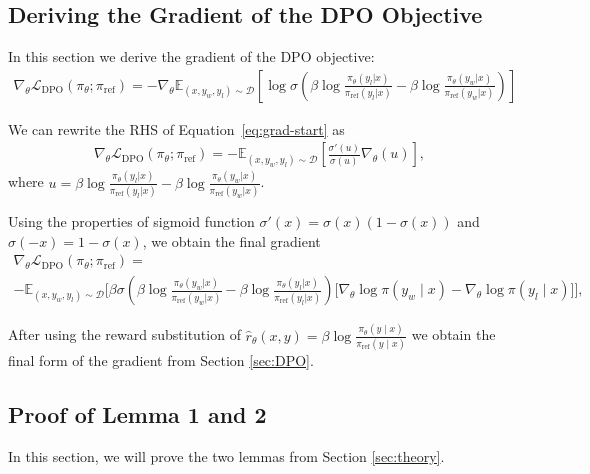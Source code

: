 \documentclass{article}
\begin{document}
\subsection{Deriving the Gradient of the DPO Objective}
\label{app:gradient_derivation}
In this section we derive the gradient of the DPO objective:
\begin{align}\label{eq:grad-start}
    \nabla_{\theta}\mathcal{L}_\text{DPO}(\pi_{\theta}; \pi_\text{ref})
    = -\nabla_{\theta}\mathbb{E}_{(x, y_w, y_l)\sim \mathcal{D}}\left[\log \sigma \left(\beta \log \frac{\pi_{\theta}(y_l|x)}{\pi_\text{ref}(y_l|x)} - \beta \log \frac{\pi_{\theta}(y_w|x)}{\pi_\text{ref}(y_w|x)}\right)\right]
\end{align}

We can rewrite the RHS of Equation~\ref{eq:grad-start} as
\begin{align}
    \nabla_{\theta}\mathcal{L}_\text{DPO}(\pi_{\theta}; \pi_\text{ref})
    =-\mathbb{E}_{(x, y_w, y_l)\sim \mathcal{D}}\left[\frac{\sigma'\left(u\right)}{\sigma \left(u\right)}\nabla_{\theta}\left(u\right)\right],
\end{align}
where $u = \beta \log \frac{\pi_{\theta}(y_l|x)}{\pi_\text{ref}(y_l|x)} - \beta \log \frac{\pi_{\theta}(y_w|x)}{\pi_\text{ref}(y_w|x)}$.

Using the properties of sigmoid function $\sigma'(x) = \sigma(x)(1-\sigma(x))$ and $\sigma(-x) = 1-\sigma(x)$, we obtain the final gradient
\begin{multline*}
\nabla_{\theta}\mathcal{L}_\text{DPO}(\pi_{\theta}; \pi_\text{ref}) = \\
     -\mathbb{E}_{(x, y_w, y_l) \sim \mathcal{D}} \bigg[\beta\sigma \left(\beta \log \frac{\pi_{\theta}(y_w|x)}{\pi_\text{ref}(y_w|x)} - \beta \log \frac{\pi_{\theta}(y_l|x)}{\pi_\text{ref}(y_l|x)}\right)\bigg[\nabla_\theta\log \pi(y_w \mid x) - \nabla_\theta\log\pi(y_l \mid x)\bigg]\bigg],
\end{multline*}

After using the reward substitution of $\hat{r}_\theta(x, y) = \beta \log \frac{\pi_\theta(y \mid x)}{\pi_\text{ref}(y \mid x)}$ we obtain the final form of the gradient from Section \ref{sec:DPO}.

\subsection{Proof of Lemma 1 and 2}
\label{app:lemma1}

In this section, we will prove the two lemmas from Section \ref{sec:theory}.
\end{document}
